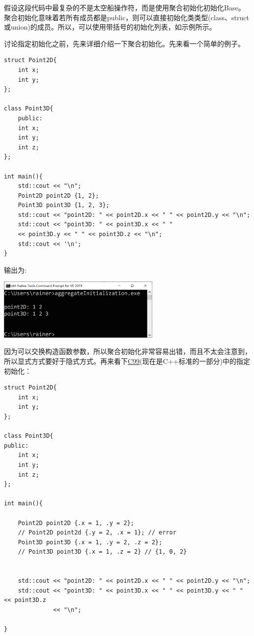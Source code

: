 假设这段代码中最复杂的不是太空船操作符，而是使用聚合初始化初始化Base。聚合初始化意味着若所有成员都是public，则可以直接初始化类类型(class、struct或union)的成员。所以，可以使用带括号的初始化列表，如示例所示。

讨论指定初始化之前，先来详细介绍一下聚合初始化。先来看一个简单的例子。

\begin{lstlisting}[style=styleCXX]
struct Point2D{
	int x;
	int y;
};

class Point3D{
	public:
	int x;
	int y;
	int z;
};

int main(){
	std::cout << "\n";
	Point2D point2D {1, 2};
	Point3D point3D {1, 2, 3};
	std::cout << "point2D: " << point2D.x << " " << point2D.y << "\n";
	std::cout << "point3D: " << point3D.x << " "
	<< point3D.y << " " << point3D.z << "\n";
	std::cout << '\n';
}
\end{lstlisting}

输出为:

\begin{center}
\includegraphics[width=0.6\textwidth]{content/2/chapter3/images/5.png}
\end{center}

因为可以交换构造函数参数，所以聚合初始化非常容易出错，而且不太会注意到，所以显式方式要好于隐式方式。再来看下\href{https://en.wikipedia.org/wiki/C99}{C99}(现在是C++标准的一部分)中的指定初始化：

\begin{lstlisting}[style=styleCXX]
struct Point2D{
	int x;
	int y;
};

class Point3D{
public:
	int x;
	int y;
	int z;
};

int main(){

	Point2D point2D {.x = 1, .y = 2};
	// Point2D point2d {.y = 2, .x = 1}; // error
	Point3D point3D {.x = 1, .y = 2, .z = 2};
	// Point3D point3D {.x = 1, .z = 2} // {1, 0, 2}


	std::cout << "point2D: " << point2D.x << " " << point2D.y << "\n";
	std::cout << "point3D: " << point3D.x << " " << point3D.y << " " << point3D.z
		      << "\n";

}
\end{lstlisting}

